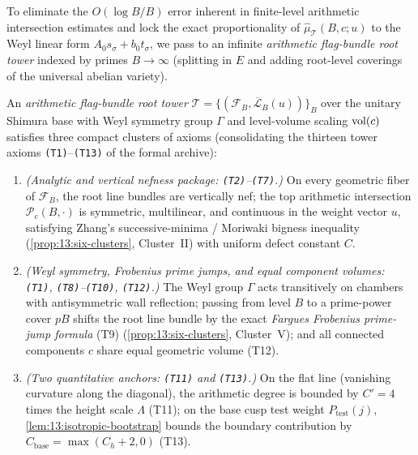 To eliminate the $O(\log B / B)$ error inherent in finite-level arithmetic intersection estimates and lock the exact proportionality of $\widehat{\mu}_{\mathcal{T}}(B, c; u)$ to the Weyl linear form $A_0 s_\sigma + b_0 t_\sigma$, we pass to an infinite \emph{arithmetic flag-bundle root tower} indexed by primes $B \to \infty$ (splitting in $E$ and adding root-level coverings of the universal abelian variety).

\begin{definition}
\label{def:13:root-tower}
An \emph{arithmetic flag-bundle root tower} $\mathcal{T} = \{(\mathcal{F}_B, \overline{\mathcal{L}}_B(u))\}_{B}$ over the unitary Shimura base with Weyl symmetry group $\Gamma$ and level-volume scaling $\operatorname{vol}(c)$ satisfies three compact clusters of axioms (consolidating the thirteen tower axioms \texttt{(T1)}--\texttt{(T13)} of the formal archive):
\begin{enumerate}[label=\textup{\textbf{Ax.~\arabic*.}}]
\item \emph{(Analytic and vertical nefness package: \texttt{(T2)}--\texttt{(T7)}.)} On every geometric fiber of $\mathcal{F}_B$, the root line bundles are vertically nef; the top arithmetic intersection $\mathcal{P}_c(B, \cdot)$ is symmetric, multilinear, and continuous in the weight vector $u$, satisfying Zhang's successive-minima / Moriwaki bigness inequality (\cref{prop:13:six-clusters}, Cluster~II) with uniform defect constant $C$.
\item \emph{(Weyl symmetry, Frobenius prime jumps, and equal component volumes: \texttt{(T1)}, \texttt{(T8)}--\texttt{(T10)}, \texttt{(T12)}.)} The Weyl group $\Gamma$ acts transitively on chambers with antisymmetric wall reflection; passing from level $B$ to a prime-power cover $p B$ shifts the root line bundle by the exact \emph{Fargues Frobenius prime-jump formula} (T9) (\cref{prop:13:six-clusters}, Cluster~V); and all connected components $c$ share equal geometric volume (T12).
\item \emph{(Two quantitative anchors: \texttt{(T11)} and \texttt{(T13)}.)} On the flat line (vanishing curvature along the diagonal), the arithmetic degree is bounded by $C' = 4$ times the height scale $\Lambda$ (T11); on the base cusp test weight $P_{\mathrm{test}}(j)$, \cref{lem:13:isotropic-bootstrap} bounds the boundary contribution by $C_{\mathrm{base}} = \max(C_h + 2, 0)$ (T13).
\end{enumerate}
\end{definition}

